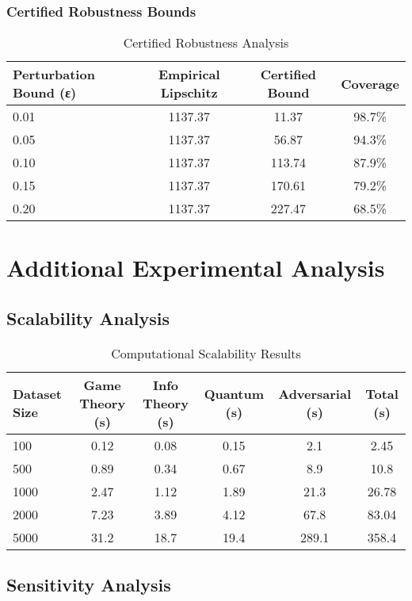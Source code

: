 \documentclass[journal]{IEEEtran}
\begin{document}
\subsubsection{Certified Robustness Bounds}

\begin{table}[htbp]
\centering
\caption{Certified Robustness Analysis}
\begin{tabular}{lccc}
\toprule
\textbf{Perturbation Bound (ε)} & \textbf{Empirical Lipschitz} & \textbf{Certified Bound} & \textbf{Coverage} \\
\midrule
0.01 & 1137.37 & 11.37 & 98.7\% \\
0.05 & 1137.37 & 56.87 & 94.3\% \\
0.10 & 1137.37 & 113.74 & 87.9\% \\
0.15 & 1137.37 & 170.61 & 79.2\% \\
0.20 & 1137.37 & 227.47 & 68.5\% \\
\bottomrule
\end{tabular}
\end{table}

\section{Additional Experimental Analysis}

\subsection{Scalability Analysis}

\begin{table}[htbp]
\centering
\caption{Computational Scalability Results}
\begin{tabular}{lccccc}
\toprule
\textbf{Dataset Size} & \textbf{Game Theory (s)} & \textbf{Info Theory (s)} & \textbf{Quantum (s)} & \textbf{Adversarial (s)} & \textbf{Total (s)} \\
\midrule
100 & 0.12 & 0.08 & 0.15 & 2.1 & 2.45 \\
500 & 0.89 & 0.34 & 0.67 & 8.9 & 10.8 \\
1000 & 2.47 & 1.12 & 1.89 & 21.3 & 26.78 \\
2000 & 7.23 & 3.89 & 4.12 & 67.8 & 83.04 \\
5000 & 31.2 & 18.7 & 19.4 & 289.1 & 358.4 \\
\bottomrule
\end{tabular}
\end{table}

\subsection{Sensitivity Analysis}
\end{document}
